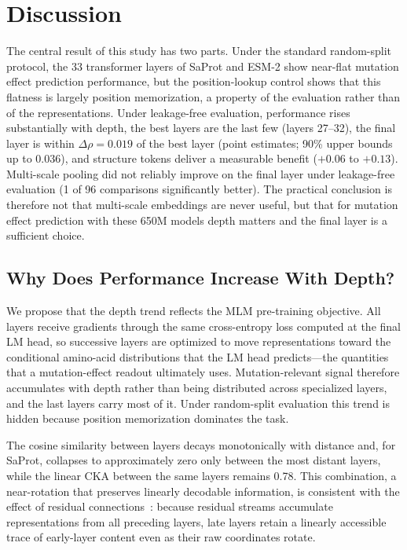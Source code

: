\documentclass[numbered,webpdf,modern,large]{oup-authoring-template}
\newcommand{\rone}[1]{#1}
\newcommand{\rtwo}[1]{#1}
\newcommand{\rthree}[1]{#1}
\begin{document}
\section{Discussion}

\rtwo{The central result of this study has two parts. Under the standard random-split
protocol, the 33 transformer layers of SaProt and ESM-2 show near-flat mutation effect
prediction performance, but the position-lookup control shows that this flatness is
largely position memorization, a property of the evaluation rather than of the
representations. Under leakage-free evaluation, performance rises substantially with
depth, the best layers are the last few (layers 27--32), the final layer is within
\rthree{$\Delta\rho = 0.019$ of the best layer (point estimates; 90\% upper bounds up to
0.036)}, and structure tokens deliver a measurable benefit (\rthree{$+0.06$ to $+0.13$}).
\rthree{Multi-scale pooling did not reliably improve on the final layer under leakage-free
evaluation (1 of 96 comparisons significantly better).} The practical conclusion is therefore not that multi-scale embeddings are
never useful, but that for mutation effect prediction with these 650M models depth
matters and the final layer is a sufficient choice.}

\subsection{\rtwo{Why Does Performance Increase With Depth?}}

\rtwo{We propose that the depth trend reflects the MLM pre-training objective. All
layers receive gradients through the same cross-entropy loss computed at the final LM
head, so successive layers are optimized to move representations toward the
conditional amino-acid distributions that the LM head predicts---the quantities that
a mutation-effect readout ultimately uses. Mutation-relevant signal therefore
accumulates with depth rather than being distributed across specialized layers, and
the last layers carry most of it. Under random-split evaluation this trend is hidden
because position memorization dominates the task.}

\rone{The cosine similarity between layers decays monotonically with distance and,
for SaProt, collapses to approximately zero only between the most distant layers,
while the linear CKA between the same layers remains \rthree{0.78}. This combination, a
near-rotation that preserves linearly decodable information, is consistent with the
effect of residual connections~\cite{he2016deep}: because residual streams accumulate
representations from all preceding layers, late layers retain a linearly accessible
trace of early-layer content even as their raw coordinates rotate.}
\end{document}
